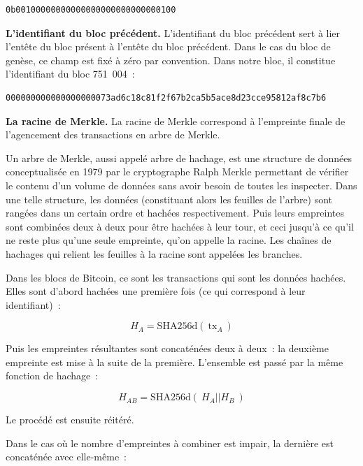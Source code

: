 \begin{Verbatim}[fontsize=\footnotesize]
0b00100000000000000000000000000100
\end{Verbatim}


\textbf{L'identifiant du bloc précédent.} L'identifiant du bloc précédent sert à lier l'entête du bloc présent à l'entête du bloc précédent. Dans le cas du bloc de genèse, ce champ est fixé à zéro par convention. Dans notre bloc, il constitue l'identifiant du bloc 751~004~:

\begin{Verbatim}[fontsize=\footnotesize]
000000000000000000073ad6c18c81f2f67b2ca5b5ace8d23cce95812af8c7b6
\end{Verbatim}


\textbf{La racine de Merkle.} La racine de Merkle correspond à l'empreinte finale de l'agencement des transactions en arbre de Merkle.

Un arbre de Merkle, aussi appelé arbre de hachage, est une structure de données conceptualisée en 1979 par le cryptographe Ralph Merkle permettant de vérifier le contenu d'un volume de données sans avoir besoin de toutes les inspecter. Dans une telle structure, les données (constituant alors les feuilles de l'arbre) sont rangées dans un certain ordre et hachées respectivement. Puis leurs empreintes sont combinées deux à deux pour être hachées à leur tour, et ceci jusqu'à ce qu'il ne reste plus qu'une seule empreinte, qu'on appelle la racine. Les chaînes de hachages qui relient les feuilles à la racine sont appelées les branches.

Dans les blocs de Bitcoin, ce sont les transactions qui sont les données hachées. Elles sont d'abord hachées une première fois (ce qui correspond à leur identifiant)~:

{ \small
\[
H_A = \mathrm{SHA256d}(~\mathrm{tx}_A~)
\]
}

Puis les empreintes résultantes sont concaténées deux à deux~: la deuxième empreinte est mise à la suite de la première. L'ensemble est passé par la même fonction de hachage~:

{ \small
\[
H_{A\!B} = \mathrm{SHA256d}(~H_A || H_B~)
\]
}

Le procédé est ensuite réitéré.

Dans le cas où le nombre d'empreintes à combiner est impair, la dernière est concaténée avec elle-même~:

